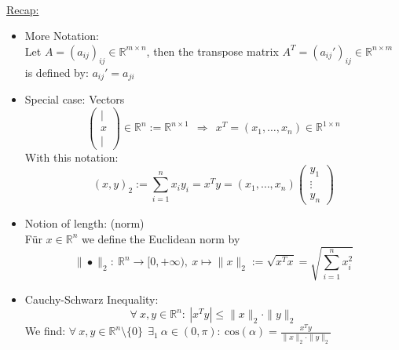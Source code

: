 \begin{frame}
	~\\
	{\blank
		\underline{Recap:}\\
		\begin{itemize}\blank
			\item More Notation:\\
			Let $A=(a_{ij})_{ij}\in\mathbb{R}^{m\times n}$, then the transpose matrix $A^T=(a_{ij}')_{ij}\in\mathbb{R}^{n\times m}$ is defined by: $a_{ij}'=a_{ji}$
			\item Special case: Vectors
			$$
			\begin{pmatrix}|\\x\\|\end{pmatrix}\in\mathbb{R}^n:=\mathbb{R}^{n\times 1}~~
			\Rightarrow~~x^T=(x_1,\dots,x_n)\in\mathbb{R}^{1\times n}
			$$
			With this notation:
			$$
			(x,y)_2:=\sum_{i=1}^{n}x_iy_i =x^Ty = (x_1,\dots,x_n)\begin{pmatrix}y_1\\\vdots\\y_n\end{pmatrix}
			$$
			\item Notion of length: (norm)\\
			Für $x\in\mathbb{R}^n$ we define the Euclidean norm by
			$$
			\|\bullet\|_2:~\mathbb{R}^n\rightarrow[0,+\infty),~x\mapsto \|x\|_2:=\sqrt{x^Tx}=\sqrt{\sum_{i=1}^{n}x_i^2}
			$$
			\item Cauchy-Schwarz Inequality:
			$$
			\forall~x,y\in\mathbb{R}^n:~|x^Ty|\leq\|x\|_2\cdot\|y\|_2
			$$
			We find: $\forall~x,y\in\mathbb{R}^n\setminus\{0\}~~\exists_1~\alpha\in (0,\pi):~\text{cos}(\alpha)=\frac{x^Ty}{\|x\|_2\cdot\|y\|_2}$
		\end{itemize}
	}
\end{frame}

